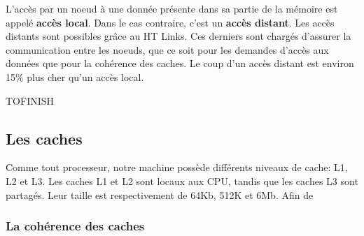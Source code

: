     L'accès par un noeud à une donnée présente dans sa partie de la mémoire est
    appelé \textbf{accès local}. Dans le cas contraire, c'est un \textbf{accès
      distant}. Les accès distants sont possibles grâce au HT Links. Ces
    derniers sont chargés d'assurer la communication entre les noeuds, que ce
    soit pour les demandes d'accès aux données que pour la cohérence des
    caches. Le coup d'un accès distant est environ 15\% plus cher qu'un accès
    local.\cite{Lepers2014}

    TOFINISH

  \subsection{Les caches}

    Comme tout processeur, notre machine possède différents niveaux de cache:
    L1, L2 et L3. Les caches L1 et L2 sont locaux aux CPU, tandis que les caches
    L3 sont partagés. Leur taille est respectivement de 64Kb, 512K et 6Mb. Afin de 

    \subsubsection{La cohérence des caches}

      
    
